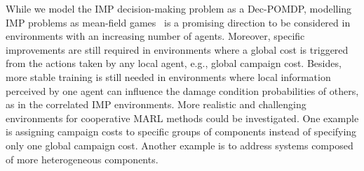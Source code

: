 While we model the IMP decision-making problem as a Dec-POMDP, modelling IMP problems as mean-field games~\citep{lauriere2022learning} is a promising direction to be considered in environments with an increasing number of agents.
Moreover, specific improvements are still required in environments where a global cost is triggered from the actions taken by any local agent, e.g., global campaign cost.
Besides, more stable training is still needed in environments where local information perceived by one agent can influence the damage condition probabilities of others, as in the correlated IMP environments.
More realistic and challenging environments for cooperative MARL methods could be investigated.
One example is assigning campaign costs to specific groups of components instead of specifying only one global campaign cost.
Another example is to address systems composed of more heterogeneous components.